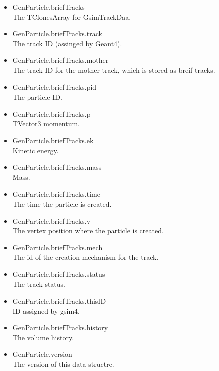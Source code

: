 \documentclass[a4paper,12pt]{article}
\begin{document}
   \begin{itemize}
    \item GenParticle.briefTracks\\
	  The TClonesArray for GsimTrackDaa.
    \item GenParticle.briefTracks.track\\
	  The track ID (assinged by Geant4). 
    \item GenParticle.briefTracks.mother\\
	  The track ID for the mother track, which is stored as breif tracks.
    \item GenParticle.briefTracks.pid\\
	  The particle ID.
    \item GenParticle.briefTracks.p\\
	  TVector3 momentum.
    \item GenParticle.briefTracks.ek\\
	  Kinetic energy.
    \item GenParticle.briefTracks.mass\\
	  Mass.
    \item GenParticle.briefTracks.time\\
	  The time the particle is created.
    \item GenParticle.briefTracks.v\\
	  The vertex position where the particle is created.
    \item GenParticle.briefTracks.mech\\
	  The id of the creation mechanism for the track.
    \item GenParticle.briefTracks.status\\
	  The track status.
    \item GenParticle.briefTracks.thisID\\
	  ID assigned by gsim4.
    \item GenParticle.briefTracks.history\\
	  The volume history.
    \item GenParticle.version\\
	  The version of this data structre.
   \end{itemize}
\end{document}
